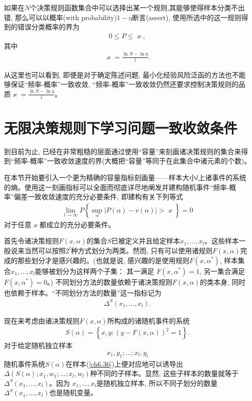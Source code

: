 \begin{theorem}\label{theorem6.2}
\citep{vapnik1998}
如果在$N$个决策规则函数集合中可以选择出某一个规则,其能够使得样本分类不出错, 那么可以以概率(with probability)$1-\eta$断言(assert), 使用所选中的这一规则得到的错误分类概率的界为
\begin{align}
0 \leq P \leq \varkappa,
\end{align}
其中
\begin{align}
\varkappa=\frac{\ln N-\ln \eta}{l}.
\end{align}
\end{theorem}

从这里也可以看到, 即便是对于确定陈述问题, 最小化经验风险泛函的方法也不能够保证“频率-概率”一致收敛, “频率-概率”一致收敛仍然还要求控制决策规则的品质$\varkappa=\frac{\ln N-\ln \eta}{l}$。


\section{无限决策规则下学习问题一致收敛条件}
到目前为止, 已经在非常粗糙的层面通过使用“容量”来刻画诸决策规则的集合来得到“频率-概率”一致收敛速度的界(大概把“容量”等同于在此集合中诸元素的个数)。

在本节开始要引入一个更为精确的容量指标刻画量——样本大小$l$上诸事件的系统的熵。使用这一刻画指标可以全面而彻底详尽地阐发并建构随机事件“频率-概率”偏差一致收敛速度的充分必要条件, 即建构有关下列等式
\begin{align}
\lim _{l \rightarrow \infty} P\left\{\sup _{\alpha}|P(\alpha)-v(\alpha)|>\varkappa\right\}=0
\end{align}
对于任意$\varkappa$都成立的充分必要条件。

首先令诸决策规则$F(x,\alpha)$的集合$S$已被定义并且给定样本$x_1,\ldots,x_l$。这些样本一般说来当然可以按照$2^{l}$种方式划分为两类。然而, 只有可以使用诸规则$F(x,\alpha)$完成的那些划分才是感兴趣的。(也就是说, 感兴趣的是使用规则$F(x,\alpha^{*})$, 样本集合$x_1,\ldots,x_{l}$能够被划分为这样两个子集： 其一满足 $F(x,\alpha^{*})=1$, 另一集合满足$F(x,\alpha^{*})=0$。) 不同划分方法的数量依赖于诸决策规则$F(x,\alpha)$的类本身, 同时也依赖于样本。“不同划分方法的数量”这一指标记为
\begin{align}
\Delta^{S}\left(x_{1}, \ldots, x_{l}\right).
\end{align}

现在来考虑由诸决策规则$F(x,\alpha)$所构成的诸随机事件的系统
\begin{align}
S(\alpha)=\left\{x, y:(y-F(x, \alpha))^{2}=1\right\}.
\end{align}
对于给定随机独立样本
\begin{align}\label{ch6.36}
x_{1}, y_{1} ; \ldots ; x_{l}, y_{l}
\end{align}
随机事件系统$S(\alpha)$在样本(\ref{ch6.36})上便对应地可以诱导出 $\Delta\left(S(\alpha);x_{1}, w_{1};\ldots; x_{l},w_{l}\right)$种不同的子样本。显然, 这些子样本的数量就等于$\Delta^{S}(x_1,\ldots,x_{l})$。因为 $x_1,\ldots,x_l$是随机独立样本, 所以不同子划分的数量$\Delta^{S}(x_1,\ldots,x_{l})$也是随机变量。

